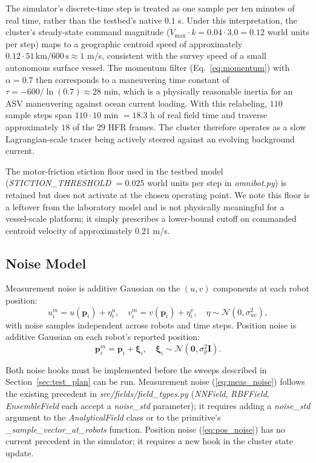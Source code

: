 \documentclass[lettersize,journal]{IEEEtran}
\begin{document}
The simulator's discrete-time step is treated as one sample per ten
minutes of real time, rather than the testbed's native $0.1$ s. Under
this interpretation, the cluster's steady-state command magnitude
($V_{\max} \cdot k = 0.04 \cdot 3.0 = 0.12$ world units per step) maps
to a geographic centroid speed of approximately
$0.12 \cdot 51 \mathrm{\,km} / 600 \mathrm{\,s} \approx 1$ m/s,
consistent with the survey speed of a small autonomous surface vessel.
The momentum filter (Eq.~\ref{eq:momentum}) with $\alpha = 0.7$ then
corresponds to a maneuvering time constant of
$\tau = -600 / \ln(0.7) \approx 28$ min, which is a physically
reasonable inertia for an ASV maneuvering against ocean current
loading. With this relabeling, $110$ sample steps span
$110 \cdot 10$ min $= 18.3$ h of real field time and traverse
approximately $18$ of the $29$ HFR frames. The cluster therefore
operates as a slow Lagrangian-scale tracer being actively steered
against an evolving background current.

The motor-friction stiction floor used in the testbed model
(\textit{STICTION\_THRESHOLD} $= 0.025$ world units per step in
\textit{omnibot.py}) is retained but does not activate at the chosen
operating point. We note this floor is a leftover from the laboratory
model and is not physically meaningful for a vessel-scale platform; it
simply prescribes a lower-bound cutoff on commanded centroid velocity
of approximately $0.21$ m/s.

\subsection{Noise Model}

Measurement noise is additive Gaussian on the $(u, v)$ components at each
robot position:
\begin{equation}
    u_i^m = u(\mathbf{p}_i) + \eta_i^u, \quad
    v_i^m = v(\mathbf{p}_i) + \eta_i^v,
    \quad \eta \sim \mathcal{N}(0, \sigma_{uv}^2),
    \label{eq:meas_noise}
\end{equation}
with noise samples independent across robots and time steps. Position noise
is additive Gaussian on each robot's reported position:
\begin{equation}
    \mathbf{p}_i^m = \mathbf{p}_i + \boldsymbol{\xi}_i, \quad
    \boldsymbol{\xi}_i \sim \mathcal{N}(\mathbf{0}, \sigma_p^2 \mathbf{I}).
    \label{eq:pos_noise}
\end{equation}

Both noise hooks must be implemented before the sweeps described in
Section~\ref{sec:test_plan} can be run. Measurement noise (\ref{eq:meas_noise})
follows the existing precedent in \textit{src/fields/field\_types.py}
(\textit{NNField}, \textit{RBFField}, \textit{EnsembleField} each accept a
\textit{noise\_std} parameter); it requires adding a \textit{noise\_std}
argument to the \textit{AnalyticalField} class or to the primitive's
\textit{\_sample\_vector\_at\_robots} function. Position noise
(\ref{eq:pos_noise}) has no current precedent in the simulator; it requires
a new hook in the cluster state update.
\end{document}
